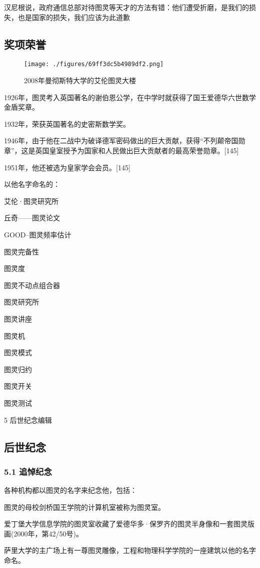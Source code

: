 汉尼根说，政府通信总部对待图灵等天才的方法有错：他们遭受折磨，是我们的损失，也是国家的损失，我们应该为此道歉

\subsection{奖项荣誉}
\begin{figure}[ht]
\centering
\texttt{[image: ./figures/69ff3dc5b4989df2.png]}
\caption{2008年曼彻斯特大学的艾伦图灵大楼} \label{fig_ALTL_7}
\end{figure}
1926年，图灵考入英国著名的谢伯恩公学，在中学时就获得了国王爱德华六世数学金盾奖章。

1932年，荣获英国著名的史密斯数学奖。

1946年，由于他在二战中为破译德军密码做出的巨大贡献，获得“不列颠帝国勋章”，这是英国皇室授予为国家和人民做出巨大贡献者的最高荣誉勋章。[145]

1951年，他还被选为皇家学会会员。[145]

以他名字命名的：

艾伦·图灵研究所

丘奇——图灵论文

GOOD–图灵频率估计

图灵完备性

图灵度

图灵不动点组合器

图灵研究所

图灵讲座

图灵机

图灵模式

图灵归约

图灵开关

图灵测试

5 后世纪念编辑

\subsection{后世纪念}
\subsubsection{5.1 追悼纪念}
各种机构都以图灵的名字来纪念他，包括：

图灵的母校剑桥国王学院的计算机室被称为图灵室。

爱丁堡大学信息学院的图灵室收藏了爱德华多·保罗齐的图灵半身像和一套图灵版画(2000年，第42/50号)。

萨里大学的主广场上有一尊图灵雕像，工程和物理科学学院的一座建筑以他的名字命名。

